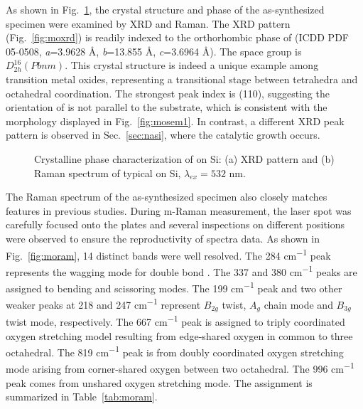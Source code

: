 As shown in Fig.~\ref{fig:mooxch}, the crystal structure and phase of the as-synthesized specimen were examined by XRD and Raman. The XRD pattern (Fig.~\ref{fig:moxrd}) is readily indexed to the orthorhombic phase of  (ICDD PDF 05-0508, \emph{a}=3.9628 \AA, \emph{b}=13.855 \AA, \emph{c}=3.6964 \AA). The space group is $D_{2h}^{16}(Pbnm)$. This crystal structure is indeed a unique example among transition metal oxides, representing a transitional stage between tetrahedra and octahedral coordination.\cite{Itoh2001a} The strongest peak index is (110), suggesting the orientation of  is not parallel to the substrate, which is consistent with the morphology displayed in Fig.~\ref{fig:mosem1}. In contrast, a different XRD peak pattern is observed in Sec.~\ref{sec:nasi}, where the catalytic growth occurs.
\begin{figure}[htb]
\centering
{}\hspace{0.04\textwidth}
\caption[Crystalline phase characterization of  on Si]{Crystalline phase characterization of  on Si: (a) XRD pattern and (b) Raman spectrum of typical  on Si, $\lambda_{ex} = 532$ nm.}
\label{fig:mooxch}
\end{figure}
The Raman spectrum of the as-synthesized specimen also closely matches  features in previous studies.\cite{Dixit1986,Silveira2012} During m-Raman measurement, the laser spot was carefully focused onto the plates and several inspections on different positions were observed to ensure the reproductivity of spectra data. As shown in Fig.~\ref{fig:moram}, 14 distinct bands were well resolved. The 284 \si{cm^{-1}} peak represents the wagging mode for double bond . The 337 and 380  \si{cm^{-1}} peaks are assigned to  bending and scissoring modes. The 199 \si{cm^{-1}} peak and two other weaker peaks at 218 and 247 \si{cm^{-1}} represent  $B_{2g}$ twist, $A_g$ chain mode and  $B_{3g}$ twist mode, respectively. The 667 \si{cm^{-1}} peak is assigned to triply coordinated oxygen stretching model resulting from edge-shared oxygen in common to three octahedral. The 819 \si{cm^{-1}} peak is from doubly coordinated oxygen stretching mode arising from corner-shared oxygen between two octahedral. The 996 \si{cm^{-1}} peak comes from unshared oxygen stretching mode.\cite{Siciliano2009} The assignment is summarized in Table~\ref{tab:moram}.

